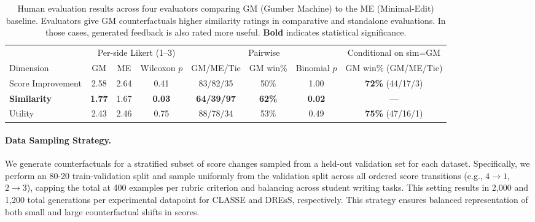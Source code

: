 \documentclass[11pt]{article}
\begin{document}
\begin{table}[ht]
\centering
\small
\begin{tabular}{l c c c c c c c}
\toprule
& \multicolumn{3}{c}{Per-side Likert (1--3)} & \multicolumn{3}{c}{Pairwise} & Conditional on sim=GM \\
\cmidrule(lr){2-4} \cmidrule(lr){5-7} \cmidrule(lr){8-8}
Dimension & GM & ME & Wilcoxon $p$ & GM/ME/Tie & GM win\% & Binomial $p$ & GM win\% (GM/ME/Tie) \\
\midrule
Score Improvement       & 2.58 & 2.64 & 0.41 & 83/82/35 & 50\% & 1.00 & \textbf{72\%} (44/17/3) \\
\textbf{Similarity} & \textbf{1.77} & 1.67 & \textbf{0.03} & \textbf{64/39/97} & \textbf{62\%} & \textbf{0.02} & --- \\
Utility      & 2.43 & 2.46 & 0.75 & 88/78/34 & 53\% & 0.49 & \textbf{75\%} (47/16/1) \\
\bottomrule
\end{tabular}
\caption{Human evaluation results across four evaluators comparing GM (Gumber Machine) to the ME (Minimal-Edit) baseline. Evaluators give GM counterfactuals higher similarity ratings in comparative and standalone evaluations. In those cases, generated feedback is also rated more useful. \textbf{Bold} indicates statistical significance.}
\label{tab:human_eval}
\end{table}

\paragraph{Data Sampling Strategy.}
We generate counterfactuals for a stratified subset of score changes sampled from a held-out validation set for each dataset. Specifically, we perform an 80-20 train-validation split and sample uniformly from the validation split across all ordered score transitions (e.g., $4 \rightarrow 1$, $2 \rightarrow 3$), capping the total at 400 examples per rubric criterion and balancing across student writing tasks. This setting results in 2,000 and 1,200 total generations per experimental datapoint for CLASSE and DREsS, respectively. This strategy ensures balanced representation of both small and large counterfactual shifts in scores.

\end{document}
